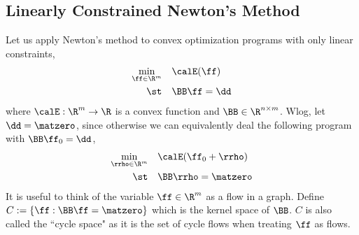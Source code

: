 \subsection{Linearly Constrained Newton's Method}
Let us apply Newton's method to convex optimization programs with only linear constraints,
\begin{align*}
  \min_{\ff\in\R^m}\quad & \calE(\ff) \\
  \st\quad  & \BB\ff = \dd
\end{align*}
where $\calE:\R^m\to\R$ is a convex function and $\BB\in\R^{n\times m}$. Wlog, let $\dd=\matzero$, since otherwise we can equivalently deal the following program with $\BB\ff_0 = \dd$,
\begin{align*}
  \min_{\rrho\in\R^m}\quad & \calE(\ff_0+\rrho) \\
  \st\quad  & \BB\rrho = \matzero
\end{align*}
It is useful to think of the variable $\ff\in\R^m$ as a flow in a graph.
Define $C := \{\ff:\BB\ff=\matzero\}$ which is the kernel space of $\BB$. $C$ is also called the ``cycle space" as it is the set of cycle flows when treating $\ff$ as flows.

